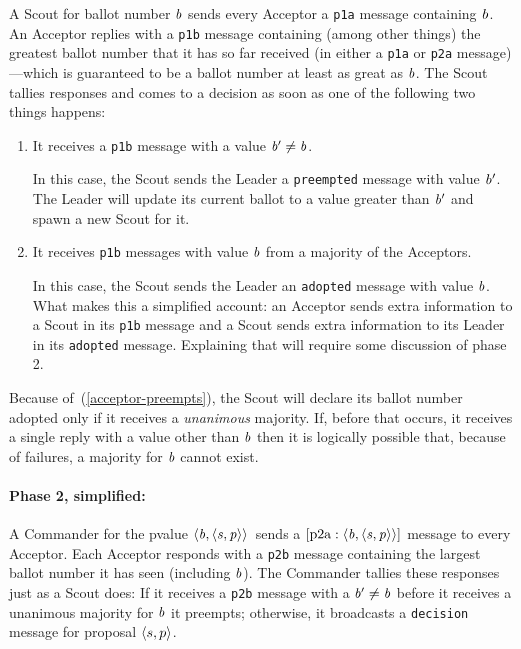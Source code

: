 \documentclass[final]{article}
\newcommand{\listinline}[1]{\text{\lstinline{#1}}}
\newcommand{\bsp}{\mbox{$\NUPRLpair{\NUPRL{b}}{\NUPRLpair{\NUPRL{s}}{\NUPRL{p}}}$}}
\newcommand{\msg}[2]{\ensuremath{[\listinline{#1}:\NUPRL{#2}]}}
\begin{document}
A Scout for ballot number $\mathit{b}$ sends every Acceptor a
\lstinline{p1a} message containing $\mathit{b}$.  An Acceptor replies
with a \lstinline{p1b} message containing (among other things) the
greatest ballot number that it has so far received (in either a
\lstinline{p1a} or \lstinline{p2a} message)---which is guaranteed
to be a ballot number at least as great as $\mathit{b}$.  The Scout
tallies responses and comes to a decision as soon as one of the
following two things happens:
\begin{enumerate}
\item\label{acceptor-preempts}
It receives a \lstinline{p1b} message with a value
$\mathit{b'}\neq\mathit{b}$.

In this case, the Scout sends the Leader a \lstinline{preempted}
message with value $\mathit{b'}$.   The Leader will update its current
ballot to a value greater than $\mathit{b'}$ and spawn a new Scout for
it.

\item
It receives \lstinline{p1b} messages with value $\mathit{b}$ from a
majority of the Acceptors.

In this case, the Scout sends the Leader an \lstinline{adopted}
message with value $\mathit{b}$.  What makes this a simplified account:
an Acceptor sends extra information to a Scout in its \lstinline{p1b}
message and a Scout sends extra information to its Leader in its
\lstinline{adopted} message.  Explaining that will require some
discussion of phase 2.
\end{enumerate}
Because of~(\ref{acceptor-preempts}), the Scout will declare its
ballot number adopted only if it receives a \emph{unanimous} majority.
If, before that occurs, it receives a single reply with a value other
than $\mathit{b}$ then it is logically possible that, because of
failures, a majority for $\mathit{b}$ cannot exist.

\paragraph{Phase 2, simplified:}

A Commander for the pvalue \bsp\ sends a \msg{p2a}{\bsp}
message to every Acceptor.  Each Acceptor responds with a
\lstinline{p2b} message containing the largest ballot number it has
seen (including $\mathit{b}$).  The Commander tallies these responses
just as a Scout does: If it receives a \lstinline{p2b} message with a
$\mathit{b'}\neq\mathit{b}$ before it receives a unanimous majority for
$\mathit{b}$ it preempts; otherwise, it broadcasts a
\lstinline{decision} message for proposal $\langle s,p\rangle$.
\end{document}
